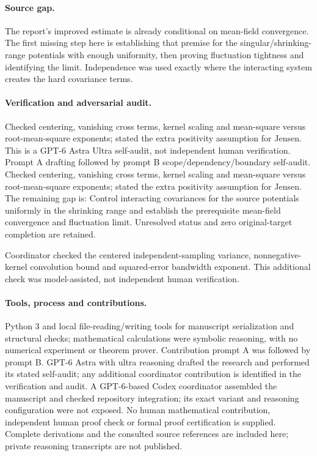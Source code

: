 \documentclass[11pt]{article}
\begin{document}
\paragraph{Source gap.} The report's improved estimate is already conditional on mean-field convergence. The first missing step here is establishing that premise for the singular/shrinking-range potentials with enough uniformity, then proving fluctuation tightness and identifying the limit. Independence was used exactly where the interacting system creates the hard covariance terms.

\paragraph{Verification and adversarial audit.}
Checked centering, vanishing cross terms, kernel scaling and mean-square versus root-mean-square exponents; stated the extra positivity assumption for Jensen. This is a GPT-6 Astra Ultra self-audit, not independent human verification. Prompt A drafting followed by prompt B scope/dependency/boundary self-audit. Checked centering, vanishing cross terms, kernel scaling and mean-square versus root-mean-square exponents; stated the extra positivity assumption for Jensen. The remaining gap is: Control interacting covariances for the source potentials uniformly in the shrinking range and establish the prerequisite mean-field convergence and fluctuation limit. Unresolved status and zero original-target completion are retained.

Coordinator checked the centered independent-sampling variance, nonnegative-kernel convolution bound and squared-error bandwidth exponent. This additional check was model-assisted, not independent human verification.

\paragraph{Tools, process and contributions.}
Python 3 and local file-reading/writing tools for manuscript serialization and structural checks; mathematical calculations were symbolic reasoning, with no numerical experiment or theorem prover. Contribution prompt A was followed by prompt B. GPT-6 Astra with ultra reasoning drafted the research and performed its stated self-audit; any additional coordinator contribution is identified in the verification and audit. A GPT-6-based Codex coordinator assembled the manuscript and checked repository integration; its exact variant and reasoning configuration were not exposed. No human mathematical contribution, independent human proof check or formal proof certification is supplied. Complete derivations and the consulted source references are included here; private reasoning transcripts are not published.
\end{document}
